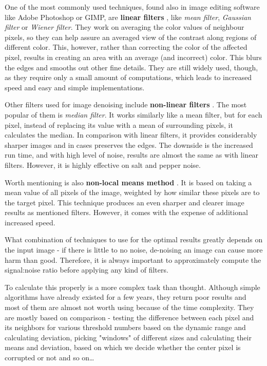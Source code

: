 \begin{description}

\item One of the most commonly used techniques, found also in image editing software like Adobe Photoshop or GIMP, are \textbf{linear filters} \citep{denoisingTechniques}, like \emph{mean filter}, \emph{Gaussian filter} or \emph{Wiener filter}. They work on averaging the color values of neighbour pixels, so they can help assure an averaged view of the contrast along regions of different color. This, however, rather than correcting the color of the affected pixel, results in creating an area with an average (and incorrect) color. This blurs the edges and smooths out other fine details. They are still widely used, though, as they require only a small amount of computations, which leads to increased speed and easy and simple implementations.

\item Other filters used for image denoising include \textbf{non-linear filters} \citep{denoisingTechniques}. The most popular of them is \emph{median filter}. It works similarly like a mean filter, but for each pixel, instead of replacing its value with a mean of surrounding pixels, it calculates the median. In comparison with linear filters, it provides considerably sharper images and in cases preserves the edges. The downside is the increased run time, and with high level of noise, results are almost the same as with linear filters. However, it is highly effective on salt and pepper noise.

\item Worth mentioning is also \textbf{non-local means method} \citep{nonLocalMeans}. It is based on taking a mean value of all pixels of the image, weighted by how similar these pixels are to the target pixel. This technique produces an even sharper and clearer image results as mentioned filters. However, it comes with the expense of additional increased speed.

\end{description}

What combination of techniques to use for the optimal results greatly depends on the input image - if there is little to no noise, de-noising an image can cause more harm than good. Therefore, it is always important to approximately compute the signal:noise ratio before applying any kind of filters.

To calculate this properly is a more complex task than thought. Although simple algorithms have already existed for a few years, they return poor results and most of them are almost not worth using because of the time complexity. They are mostly based on comparison - testing the difference between each pixel and its neighbors for various threshold numbers based on the dynamic range and calculating deviation, picking "windows" of different sizes and calculating their means and deviation, based on which we decide whether the center pixel is corrupted or not and so on\ldots

